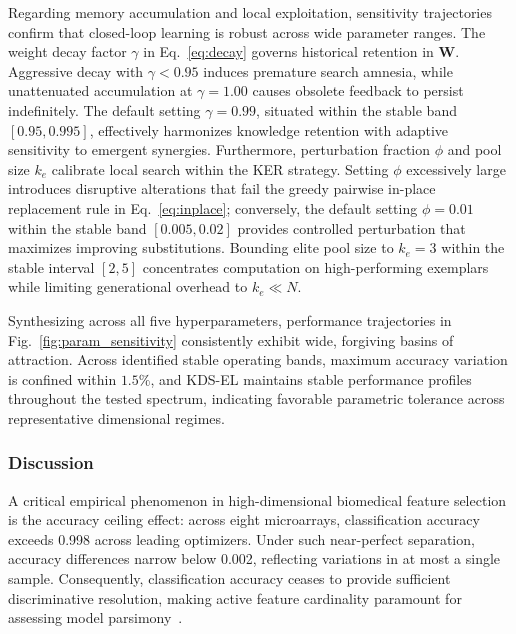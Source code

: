 Regarding memory accumulation and local exploitation, sensitivity trajectories confirm that closed-loop learning is robust across wide parameter ranges. The weight decay factor $\gamma$ in Eq.~\eqref{eq:decay} governs historical retention in $\mathbf{W}$. Aggressive decay with $\gamma < 0.95$ induces premature search amnesia, while unattenuated accumulation at $\gamma = 1.00$ causes obsolete feedback to persist indefinitely. The default setting $\gamma = 0.99$, situated within the stable band $[0.95, 0.995]$, effectively harmonizes knowledge retention with adaptive sensitivity to emergent synergies. Furthermore, perturbation fraction $\phi$ and pool size $k_e$ calibrate local search within the KER strategy. Setting $\phi$ excessively large introduces disruptive alterations that fail the greedy pairwise in-place replacement rule in Eq.~\eqref{eq:inplace}; conversely, the default setting $\phi = 0.01$ within the stable band $[0.005, 0.02]$ provides controlled perturbation that maximizes improving substitutions. Bounding elite pool size to $k_e = 3$ within the stable interval $[2, 5]$ concentrates computation on high-performing exemplars while limiting generational overhead to $k_e \ll N$.

Synthesizing across all five hyperparameters, performance trajectories in Fig.~\ref{fig:param_sensitivity} consistently exhibit wide, forgiving basins of attraction. Across identified stable operating bands, maximum accuracy variation is confined within $1.5\%$, and KDS-EL maintains stable performance profiles throughout the tested spectrum, indicating favorable parametric tolerance across representative dimensional regimes.

\subsubsection{Discussion}\label{sec:discussion}\label{sec:ceiling}

A critical empirical phenomenon in high-dimensional biomedical feature selection is the accuracy ceiling effect: across eight microarrays, classification accuracy exceeds 0.998 across leading optimizers. Under such near-perfect separation, accuracy differences narrow below 0.002, reflecting variations in at most a single sample. Consequently, classification accuracy ceases to provide sufficient discriminative resolution, making active feature cardinality paramount for assessing model parsimony~\cite{guyon2003,liang2025}.

